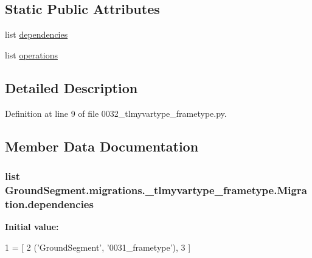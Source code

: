 \subsection*{Static Public Attributes}
\begin{DoxyCompactItemize}
\item 
list \hyperlink{class_ground_segment_1_1migrations_1_10032__tlmyvartype__frametype_1_1_migration_a85f456677658344f33a5994219e45a10}{dependencies}
\item 
list \hyperlink{class_ground_segment_1_1migrations_1_10032__tlmyvartype__frametype_1_1_migration_ae32cc0c05a0d7419a9df3d56668f7eb3}{operations}
\end{DoxyCompactItemize}


\subsection{Detailed Description}


Definition at line 9 of file 0032\+\_\+tlmyvartype\+\_\+frametype.\+py.



\subsection{Member Data Documentation}
\hypertarget{class_ground_segment_1_1migrations_1_10032__tlmyvartype__frametype_1_1_migration_a85f456677658344f33a5994219e45a10}{}
\subsubsection[{dependencies}]{\setlength{\rightskip}{0pt plus 5cm}list Ground\+Segment.\+migrations.\+\_\+tlmyvartype\+\_\+frametype.\+Migration.\+dependencies\hspace{0.3cm}{\ttfamily [static]}}\label{class_ground_segment_1_1migrations_1_10032__tlmyvartype__frametype_1_1_migration_a85f456677658344f33a5994219e45a10}
{\bfseries Initial value\+:}
\begin{DoxyCode}
1 = [
2         (\textcolor{stringliteral}{'GroundSegment'}, \textcolor{stringliteral}{'0031\_frametype'}),
3     ]
\end{DoxyCode}


